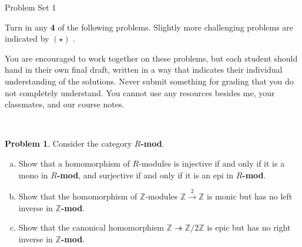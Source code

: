 \documentclass[11pt]{article}
\title{}
\date{\vspace{-0.5in}}
\newcommand{\Z}{\mathbb{Z}}
\theoremstyle{definition}
\newtheorem{problem}{Problem}
\begin{document}
\thispagestyle{fancy}
\pagestyle{fancy}

\vspace{3em}

\begin{center}
	{\LARGE Problem Set 1}
\end{center}


\vspace{0.5em}


\noindent
Turn in any {\bf 4} of the following problems. 
Slightly more challenging problems are indicated by $(\star)$ .

%
\noindent
You are encouraged to work together on these problems, but each student should hand in their own final draft, written in a way that indicates their individual understanding of the solutions. Never submit something for grading that you do not completely understand. You cannot use any resources besides me, your classmates, and our course notes.
%
%


\


\begin{problem}
Consider the category {\bf $R$-mod}.
\vspace{-0.3em}
\begin{enumerate}[a)]
\item Show that a homomorphism of $R$-modules is injective if and only if it is a mono in {\bf $R$-mod}, and surjective if and only if it is an epi in {\bf $R$-mod}.

\item Show that the homomorphism of $\Z$-modules $\Z \xrightarrow{2} \Z$ is monic but has no left inverse in {\bf $\Z$-mod}.

\item Show that the canonical homomorphism $\Z \twoheadrightarrow \Z/2\Z$ is epic but has no right inverse in {\bf $\Z$-mod}.
\end{enumerate}
\end{problem}
\end{document}
